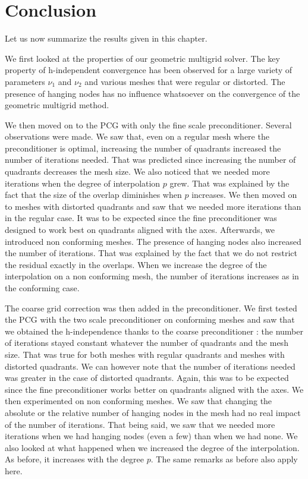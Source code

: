 \section{Conclusion}

Let us now summarize the results given in this chapter. 

We first looked at the properties of our geometric multigrid solver. The key property of h-independent convergence has been observed for a large variety of parameters $\nu_1$ and $\nu_2$ and various meshes that were regular or distorted. The presence of hanging nodes has no influence whatsoever on the convergence of the geometric multigrid method. 

We then moved on to the PCG with only the fine scale preconditioner. Several observations were made. We saw that, even on a regular mesh where the preconditioner is optimal, increasing the number of quadrants increased the number of iterations needed. That was predicted since increasing the number of quadrants decreases the mesh size. We also noticed that we needed more iterations when the degree of interpolation $p$ grew. That was explained by the fact that the size of the overlap diminishes when $p$ increases. We then moved on to meshes with distorted quadrants and saw that we needed more iterations than in the regular case. It was to be expected since the fine preconditioner was designed to work best on quadrants aligned with the axes. Afterwards, we introduced non conforming meshes. The presence of hanging nodes also increased the number of iterations. That was explained by the fact that we do not restrict the residual exactly in the overlaps. When we increase the degree of the interpolation on a non conforming mesh, the number of iterations increases as in the conforming case. 

The coarse grid correction was then added in the preconditioner. We first tested the PCG with the two scale preconditioner on conforming meshes and saw that we obtained the h-independence thanks to the coarse preconditioner : the number of iterations stayed constant whatever the number of quadrants and the mesh size. That was true for both meshes with regular quadrants and meshes with distorted quadrants. We can however note that the number of iterations needed was greater in the case of distorted quadrants. Again, this was to be expected since the fine preconditioner works better on quadrants aligned with the axes. We then experimented on non conforming meshes. We saw that changing the absolute or the relative number of hanging nodes in the mesh had no real impact of the number of iterations. That being said, we saw that we needed more iterations when we had hanging nodes (even a few) than when we had none. We also looked at what happened when we increased the degree of the interpolation. As before, it increases with the degree $p$. The same remarks as before also apply here. 

